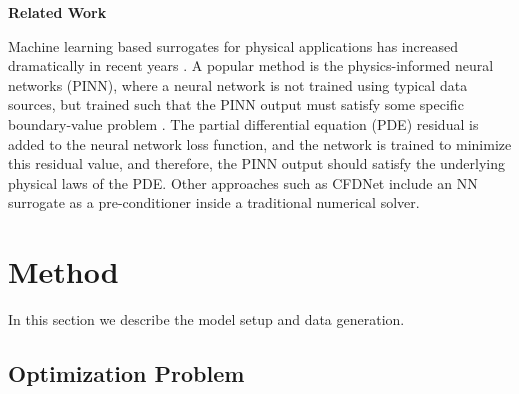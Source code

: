 \documentclass{article} %
\begin{document}


\textbf{Related Work}

Machine learning based surrogates for physical applications has increased dramatically in recent years \cite{Vinuesa2021,Laubscher2021,Chen2021,Zhu2019}. 
A popular method is the physics-informed neural networks (PINN), where a neural network is not trained using typical data sources, but trained such that the PINN output must satisfy some specific boundary-value problem \cite{pinn}. 
The partial differential equation (PDE) residual is added to the neural network loss function, and the network is trained to minimize this residual value, and therefore, the PINN output should satisfy the underlying physical laws of the PDE.
Other approaches such as CFDNet \cite{cfdnet} include an NN surrogate as a pre-conditioner inside a traditional numerical solver.

\section{Method}
\label{sec:method}

In this section we describe the model setup and data generation. 

\subsection{Optimization Problem}
\end{document}
